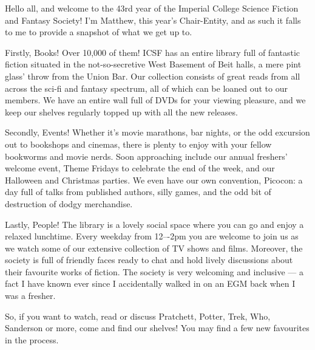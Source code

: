 Hello all, and welcome to the 43rd year of the Imperial College
Science Fiction and Fantasy Society!  I’m Matthew, this year’s
Chair-Entity, and as such it falls to me to provide a snapshot of what
we get up to.

Firstly, Books! Over 10,000 of them! ICSF has an entire library full
of fantastic fiction situated in the not-so-secretive West Basement of
Beit halls, a mere pint glass’ throw\footnotemark[2]{} from the Union
Bar. Our collection consists of great reads from all across the sci-fi
and fantasy spectrum, all of which can be loaned out to our
members. We have an entire wall full of DVDs for your viewing
pleasure, and we keep our shelves regularly topped up with all the new
releases.

Secondly, Events! Whether it’s movie marathons, bar nights, or the odd
excursion out to bookshops and cinemas, there is plenty to enjoy with
your fellow bookworms and movie nerds. Soon approaching include our
annual freshers’ welcome event, Theme Fridays to celebrate the end of
the week, and our Halloween and Christmas parties. We even have our
own convention, Picocon: a day full of talks from published authors,
silly games, and the odd bit of destruction of dodgy merchandise.

Lastly, People! The library is a lovely social space where you can go
and enjoy a relaxed lunchtime.  Every weekday from 12–-2pm you are
welcome to join us as we watch some of our extensive collection of TV
shows and films. Moreover, the society is full of friendly faces ready
to chat and hold lively discussions about their favourite works of
fiction. The society is very welcoming and inclusive --- a fact I have
known ever since I accidentally walked in on an EGM back when I was a
fresher.

So, if you want to watch, read or discuss Pratchett, Potter, Trek,
Who, Sanderson or more, come and find our shelves! You may find a few
new favourites in the process.
